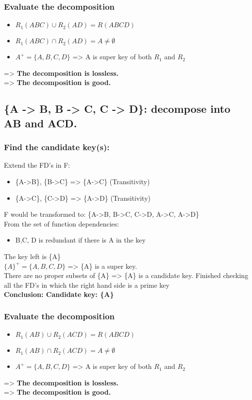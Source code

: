 \subsubsection{Evaluate the decomposition}
\begin{itemize}
    \item $R_{1}(ABC) \cup R_{2}(AD) = R(ABCD)$
    \item $R_{1}(ABC) \cap R_{2}(AD) = A \neq \emptyset$
    \item $A^{+} = \{A,B,C,D\}$ => A is super key of both $R_{1}$ and $R_{2}$
\end{itemize}
=> \textbf{The decomposition is lossless.} \\
=> \textbf{The decomposition is good.}

\subsection{\{A -> B, B -> C, C -> D\}: decompose into AB and ACD.}
\subsubsection{Find the candidate key(s):}
Extend the FD's in F:
\begin{itemize}
    \item \{A->B\}, \{B->C\} => \{A->C\} (Transitivity)
    \item \{A->C\}, \{C->D\} => \{A->D\} (Transitivity)
\end{itemize}
F would be transformed to: \{A->B, B->C, C->D, A->C, A->D\} \\
From the set of function dependencies:
\begin{itemize}
    \item B,C, D is redundant if there is A in the key
\end{itemize}
The key left is \{A\} \\
$\{A\}^{+} = \{A,B,C,D\}$ => \{A\} is a super key. \\
There are no proper subsets of \{A\} => \{A\} is a candidate key.
Finished checking all the FD's in which the right hand side is a prime key \\
\textbf{Conclusion: Candidate key: \{A\}}

\subsubsection{Evaluate the decomposition}
\begin{itemize}
    \item $R_{1}(AB) \cup R_{2}(ACD) = R(ABCD)$
    \item $R_{1}(AB) \cap R_{2}(ACD) = A \neq \emptyset$
    \item $A^{+} = \{A,B,C,D\}$ => A is super key of both $R_{1}$ and $R_{2}$
\end{itemize}
=> \textbf{The decomposition is lossless.}\\
=> \textbf{The decomposition is good.}

